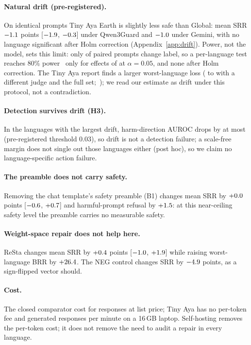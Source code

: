 \documentclass{article}
\newcommand{\ci}[2]{{\small[$#1$, $#2$]}}
\begin{document}
\paragraph{Natural drift (pre-registered).} On identical prompts Tiny Aya Earth is slightly less safe than Global: mean SRR $-1.1$ points \ci{\DriftQSrrLo}{\DriftQSrrHi} under Qwen3Guard and $-1.0$ under Gemini, with no language significant after Holm correction (Appendix~\ref{app:drift}). Power, not the model, sets this limit: only \PowerPsiHarm{} of paired prompts change label, so a per-language test reaches 80\% power~\citep{connor1987mcnemar} only for effects of \PowerMdeHarm{} at $\alpha{=}0.05$, and none after Holm correction. The Tiny Aya report finds a larger worst-language loss (\ReportMinSafeGlobal{} to \ReportMinSafeEarth{} with a different judge and the full set;~\citealp{salamanca2026tinyaya}); we read our estimate as drift under this protocol, not a contradiction.
\paragraph{Detection survives drift (H3).} In the languages with the largest drift, harm-direction AUROC drops by at most \HThreeAurocDropMax{} (pre-registered threshold 0.03), so drift is not a detection failure; a scale-free margin does not single out those languages either (post hoc), so we claim no language-specific action failure.
\paragraph{The preamble does not carry safety.} Removing the chat template's safety preamble (B1) changes mean SRR by $+0.0$ points \ci{\PreQSrrLo}{\PreQSrrHi} and harmful-prompt refusal by $+1.5$: at this near-ceiling safety level the preamble carries no measurable safety.
\paragraph{Weight-space repair does not help here.} ReSta changes mean SRR by $+0.4$ points \ci{\RestaQSrrLo}{\RestaQSrrHi} while raising worst-language BRR by $+26.4$. The NEG control changes SRR by $-4.9$ points, as a sign-flipped vector should.
\paragraph{Cost.} The closed comparator cost \RoiGemCost{} for \RoiGemN{} responses at list price; Tiny Aya has no per-token fee and generated \RoiTinyPerMin{} responses per minute on a 16\,GB laptop. Self-hosting removes the per-token cost; it does not remove the need to audit a repair in every language.
\end{document}
